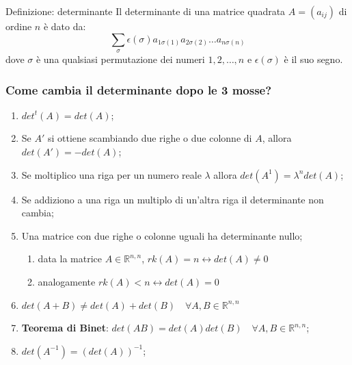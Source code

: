 \documentclass[x11names]{article}
\begin{document}
\begin{center}
\colorbox{myblue}{\begin{minipage}{5.75in}
\begin{blues}{Definizione: determinante}
Il determinante di una matrice quadrata $A = (a_{ij})$ di ordine $n$ è dato da: 
$$
\sum_{\sigma} \epsilon (\sigma)a_{1\sigma(1)}a_{2\sigma (2)}\dots a_{n\sigma(n)}
$$
dove $\sigma$ è una qualsiasi permutazione dei numeri $1,2,\dots,n$ e $\epsilon(\sigma)$ è il suo segno. 
\end{blues}
\end{minipage}}        
\end{center}

\subsubsection{Come cambia il determinante dopo le 3 mosse?}
\begin{enumerate}
    \item $det^t(A) = det(A)$;
    \item Se $A'$ si ottiene scambiando due righe o due colonne di $A$, allora $det(A') = -det(A)$;
    \item Se moltiplico una riga per un numero reale $\lambda$ allora $det(A^1) = \lambda^n det(A)$;
    \item Se addiziono a una riga un multiplo di un'altra riga il determinante non cambia;
    \item Una matrice con due righe o colonne uguali ha determinante nullo;
    \begin{enumerate}
        \item data la matrice $A \in \mathbb{R}^{n,n}$, $rk(A) = n \longleftrightarrow det(A) \neq 0$
        \item analogamente $rk(A) < n \longleftrightarrow det(A) = 0$
    \end{enumerate}
            
    \item $det(A+B) \neq det(A) + det(B)\quad \forall A,B \in \mathbb{R}^{n,n}$
\item \colorbox{myred}{\begin{minipage}{3.5in}\textbf{Teorema di Binet}: $det(AB) = det(A) det(B) \quad \forall A,B \in \mathbb{R}^{n,n}$;\end{minipage}}
    \item $det(A^{-1}) = (det(A))^{-1}$;
\end{enumerate}
\end{document}
